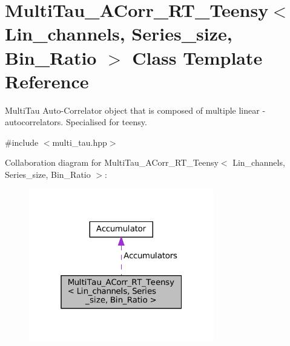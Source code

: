 \hypertarget{classMultiTau__ACorr__RT__Teensy}{}\section{Multi\+Tau\+\_\+\+A\+Corr\+\_\+\+R\+T\+\_\+\+Teensy$<$ Lin\+\_\+channels, Series\+\_\+size, Bin\+\_\+\+Ratio $>$ Class Template Reference}
\label{classMultiTau__ACorr__RT__Teensy}


Multi\+Tau Auto-\/\+Correlator object that is composed of multiple linear -\/ autocorrelators. Specialised for teensy.  




{\ttfamily \#include $<$multi\+\_\+tau.\+hpp$>$}



Collaboration diagram for Multi\+Tau\+\_\+\+A\+Corr\+\_\+\+R\+T\+\_\+\+Teensy$<$ Lin\+\_\+channels, Series\+\_\+size, Bin\+\_\+\+Ratio $>$\+:
\nopagebreak
\begin{figure}[H]
\begin{center}
\leavevmode
\includegraphics[width=229pt]{classMultiTau__ACorr__RT__Teensy__coll__graph}
\end{center}
\end{figure}
